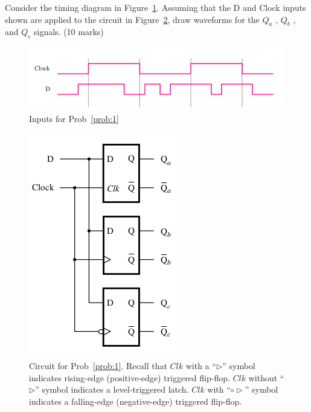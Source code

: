 \begin{prob}
  Consider the timing diagram in Figure~\ref{fig:p51}. Assuming that the D and Clock inputs shown
  are applied to the circuit in Figure~\ref{fig:5.10}, draw waveforms for the
  $Q_a$ , $Q_b$ , and $Q_c$ signals. (10 marks)~\cite[Prob 5.1]{brown2013fundamentals}
  \label{prob:1}
\end{prob}
\begin{figure}[h]
  \includegraphics[width=\linewidth]{homeworks/hw7/fig-p5.1.png}
  \caption{Inputs for Prob~\ref{prob:1}}
  \label{fig:p51}
\end{figure}
\begin{figure}[ht!]
  \includegraphics[width=0.7\linewidth]{homeworks/hw7/fig-5.10.png}
  \caption{Circuit for Prob~\ref{prob:1}.
    Recall that $Clk$ with a ``$\triangleright$'' symbol
    indicates rising-edge (positive-edge) triggered flip-flop. $Clk$ without
    ``$\triangleright$'' symbol indicates a level-triggered latch.
    $Clk$ with ``$\circ\triangleright$'' symbol
    indicates a falling-edge (negative-edge) triggered flip-flop. 
  }
  \label{fig:5.10}
\end{figure}

